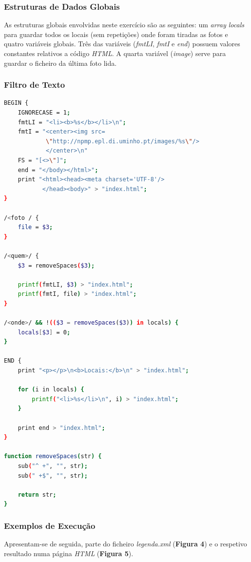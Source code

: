 \documentclass{article}
\begin{document}
\subsubsection{Estruturas de Dados Globais}

As estruturas globais envolvidas neste exercício são as seguintes: um \emph{array locals} para guardar todos os locais (sem repetições) onde foram tiradas as fotos e quatro variáveis globais. Três das variáveis (\emph{fmtLI}, \emph{fmtI} e \emph{end}) possuem valores constantes relativos a código \emph{HTML}. A quarta variável (\emph{image}) serve para guardar o ficheiro da última foto lida.


\subsubsection{Filtro de Texto}

\begin{lstlisting}[language=bash]
BEGIN {
	IGNORECASE = 1;
	fmtLI = "<li><b>%s</b></li>\n";
	fmtI = "<center><img src=
	        \"http://npmp.epl.di.uminho.pt/images/%s\"/> 
	        </center>\n"
	FS = "[<>\"]";
	end = "</body></html>";
	print "<html><head><meta charset='UTF-8'/>
	       </head><body>" > "index.html";
}

/<foto / {
	file = $3;
}

/<quem>/ {
	$3 = removeSpaces($3);

	printf(fmtLI, $3) > "index.html";
	printf(fmtI, file) > "index.html";
}

/<onde>/ && !(($3 = removeSpaces($3)) in locals) {
	locals[$3] = 0;
}

END {
	print "<p></p>\n<b>Locais:</b>\n" > "index.html";
	
	for (i in locals) {
		printf("<li>%s</li>\n", i) > "index.html";
	}

	print end > "index.html";
}

function removeSpaces(str) {
	sub("^ +", "", str);
	sub(" +$", "", str);

	return str;
}

\end{lstlisting}

\subsubsection{Exemplos de Execução}

Apresentam-se de seguida, parte do ficheiro \emph{legenda.xml} (\textbf{Figura 4}) e o respetivo resultado numa página \emph{HTML} (\textbf{Figura 5}).
\end{document}
